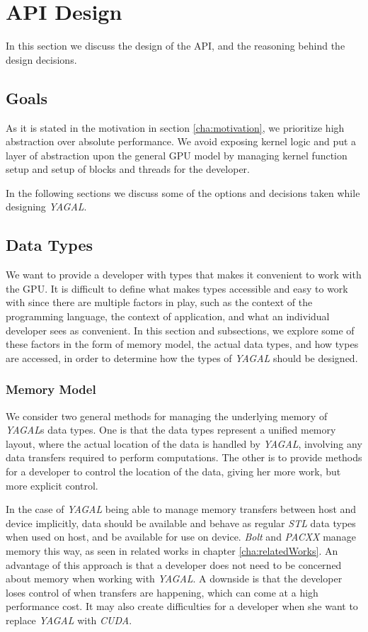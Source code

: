 \section{API Design}
In this section we discuss the design of the API, and the reasoning behind the design decisions.

\subsection{Goals}
As it is stated in the motivation in section \ref{cha:motivation}, we prioritize high abstraction over absolute performance. We avoid exposing kernel logic and put a layer of abstraction upon the general GPU model by managing kernel function setup and setup of blocks and threads for the developer.

In the following sections we discuss some of the options and decisions taken while designing \textit{YAGAL}.

\subsection{Data Types}
We want to provide a developer with types that makes it convenient to work with the GPU. It is difficult to define what makes types accessible and easy to work with since there are multiple factors in play, such as the context of the programming language, the context of application, and what an individual developer sees as convenient. In this section and subsections, we explore some of these factors in the form of memory model, the actual data types, and how types are accessed, in order to determine how the types of \textit{YAGAL} should be designed.

\subsubsection{Memory Model} \label{memoryModelDesign}
We consider two general methods for managing the underlying memory of \textit{YAGAL}s data types. One is that the data types represent a unified memory layout, where the actual location of the data is handled by \textit{YAGAL}, involving any data transfers required to perform computations. The other is to provide methods for a developer to control the location of the data, giving her more work, but more explicit control. 

In the case of \textit{YAGAL} being able to manage memory transfers between host and device implicitly, data should be available and behave as regular \textit{STL} data types when used on host, and be available for use on device. \textit{Bolt} and \textit{PACXX} manage memory this way, as seen in related works in chapter \ref{cha:relatedWorks}. An advantage of this approach is that a developer does not need to be concerned about memory when working with \textit{YAGAL}. A downside is that the developer loses control of when transfers are happening, which can come at a high performance cost. It may also create difficulties for a developer when she want to replace \textit{YAGAL} with \textit{CUDA}.

